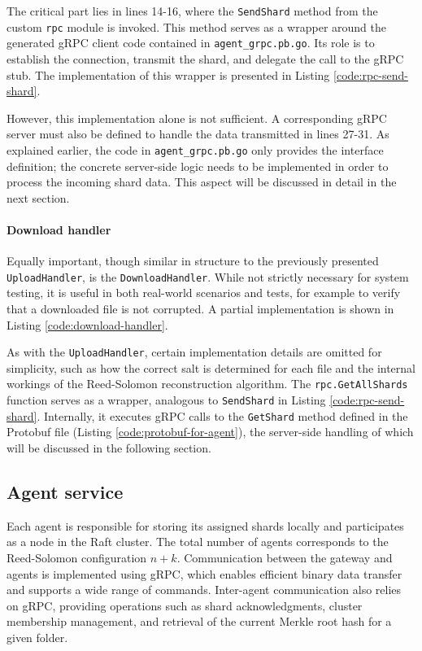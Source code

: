 The critical part lies in lines 14-16, where the \texttt{SendShard} method from the custom \texttt{rpc} module is invoked. This method serves as a wrapper around the generated gRPC client code contained in \texttt{agent\_grpc.pb.go}. Its role is to establish the connection, transmit the shard, and delegate the call to the gRPC stub. The implementation of this wrapper is presented in Listing \ref{code:rpc-send-shard}.

However, this implementation alone is not sufficient. A corresponding gRPC server must also be defined to handle the data transmitted in lines 27-31. As explained earlier, the code in \texttt{agent\_grpc.pb.go} only provides the interface definition; the concrete server-side logic needs to be implemented in order to process the incoming shard data. This aspect will be discussed in detail in the next section.

\paragraph{Download handler}

Equally important, though similar in structure to the previously presented \texttt{UploadHandler}, is the \texttt{DownloadHandler}. While not strictly necessary for system testing, it is useful in both real-world scenarios and tests, for example to verify that a downloaded file is not corrupted. A partial implementation is shown in Listing \ref{code:download-handler}.

As with the \texttt{UploadHandler}, certain implementation details are omitted for simplicity, such as how the correct salt is determined for each file and the internal workings of the Reed-Solomon reconstruction algorithm. The \texttt{rpc.GetAllShards} function serves as a wrapper, analogous to \texttt{SendShard} in Listing \ref{code:rpc-send-shard}. Internally, it executes gRPC calls to the \texttt{GetShard} method defined in the Protobuf file (Listing \ref{code:protobuf-for-agent}), the server-side handling of which will be discussed in the following section.

\newpage

\subsection{Agent service}

Each agent is responsible for storing its assigned shards locally and participates as a node in the Raft cluster. The total number of agents corresponds to the Reed-Solomon configuration $n+k$. Communication between the gateway and agents is implemented using gRPC, which enables efficient binary data transfer and supports a wide range of commands. Inter-agent communication also relies on gRPC, providing operations such as shard acknowledgments, cluster membership management, and retrieval of the current Merkle root hash for a given folder.

